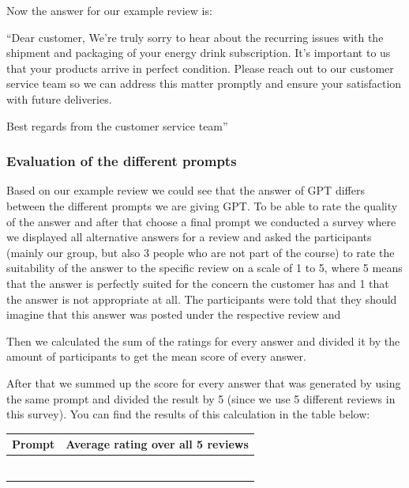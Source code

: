 \documentclass[
]{article}
\begin{document}
Now the answer for our example review is:

``Dear customer, We're truly sorry to hear about the recurring issues
with the shipment and packaging of your energy drink subscription. It's
important to us that your products arrive in perfect condition. Please
reach out to our customer service team so we can address this matter
promptly and ensure your satisfaction with future deliveries.

Best regards from the customer service team''

\hypertarget{evaluation-of-the-different-prompts}{%
\subsubsection{Evaluation of the different
prompts}\label{evaluation-of-the-different-prompts}}

Based on our example review we could see that the answer of GPT differs
between the different prompts we are giving GPT. To be able to rate the
quality of the answer and after that choose a final prompt we conducted
a survey where we displayed all alternative answers for a review and
asked the participants (mainly our group, but also 3 people who are not
part of the course) to rate the suitability of the answer to the
specific review on a scale of 1 to 5, where 5 means that the answer is
perfectly suited for the concern the customer has and 1 that the answer
is not appropriate at all. The participants were told that they should
imagine that this answer was posted under the respective review and

Then we calculated the sum of the ratings for every answer and divided
it by the amount of participants to get the mean score of every answer.

After that we summed up the score for every answer that was generated by
using the same prompt and divided the result by 5 (since we use 5
different reviews in this survey). You can find the results of this
calculation in the table below:

\begin{longtable}[]{@{}ll@{}}
\toprule\noalign{}
Prompt & Average rating over all 5 reviews \\
\midrule\noalign{}
\endhead
\bottomrule\noalign{}
\endlastfoot
& \\
& \\
& \\
& \\
& \\
& \\
\end{longtable}
\end{document}
